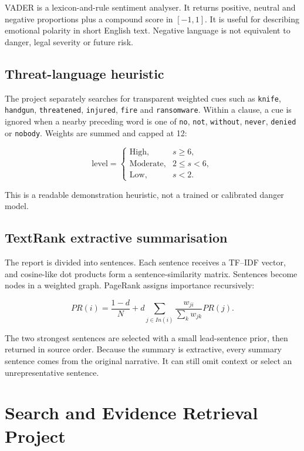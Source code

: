 \documentclass[12pt,a4paper]{report}
\newcommand{\code}[1]{\texttt{#1}}
\begin{document}
VADER is a lexicon-and-rule sentiment analyser. It returns positive, neutral and negative proportions plus a compound score in $[-1,1]$. It is useful for describing emotional polarity in short English text. Negative language is not equivalent to danger, legal severity or future risk.

\section{Threat-language heuristic}

The project separately searches for transparent weighted cues such as \code{knife}, \code{handgun}, \code{threatened}, \code{injured}, \code{fire} and \code{ransomware}. Within a clause, a cue is ignored when a nearby preceding word is one of \code{no}, \code{not}, \code{without}, \code{never}, \code{denied} or \code{nobody}. Weights are summed and capped at 12:

\begin{equation}
\text{level}=\begin{cases}
\text{High},&s\geq6,\\
\text{Moderate},&2\leq s<6,\\
\text{Low},&s<2.
\end{cases}
\end{equation}

This is a readable demonstration heuristic, not a trained or calibrated danger model.

\section{TextRank extractive summarisation}

The report is divided into sentences. Each sentence receives a TF--IDF vector, and cosine-like dot products form a sentence-similarity matrix. Sentences become nodes in a weighted graph. PageRank assigns importance recursively:

\begin{equation}
PR(i)=\frac{1-d}{N}+d\sum_{j\in In(i)}\frac{w_{ji}}{\sum_k w_{jk}}PR(j).
\end{equation}

The two strongest sentences are selected with a small lead-sentence prior, then returned in source order. Because the summary is extractive, every summary sentence comes from the original narrative. It can still omit context or select an unrepresentative sentence.

\chapter{Search and Evidence Retrieval Project}
\end{document}
